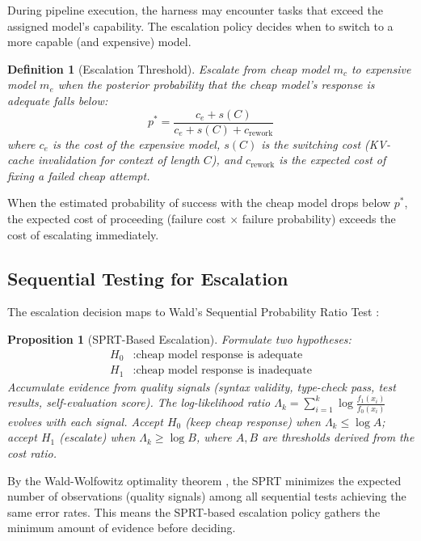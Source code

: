 \documentclass[11pt, a4paper, logo, copyright]{googledeepmind}
\newtheorem{definition}{Definition}[section]
\newtheorem{proposition}{Proposition}[section]
\begin{document}
During pipeline execution, the harness may encounter tasks that exceed the assigned model's capability. The escalation policy decides when to switch to a more capable (and expensive) model.

\begin{definition}[Escalation Threshold]
Escalate from cheap model $m_c$ to expensive model $m_e$ when the posterior probability that the cheap model's response is adequate falls below:
\begin{equation}
\label{eq:escalation}
p^* = \frac{c_e + s(C)}{c_e + s(C) + c_{\mathrm{rework}}}
\end{equation}
where $c_e$ is the cost of the expensive model, $s(C)$ is the switching cost (KV-cache invalidation for context of length $C$), and $c_{\mathrm{rework}}$ is the expected cost of fixing a failed cheap attempt.
\end{definition}

When the estimated probability of success with the cheap model drops below $p^*$, the expected cost of proceeding (failure cost $\times$ failure probability) exceeds the cost of escalating immediately.

\subsection{Sequential Testing for Escalation}

The escalation decision maps to Wald's Sequential Probability Ratio Test \citep{wald1945}:

\begin{proposition}[SPRT-Based Escalation]
\label{prop:sprt}
Formulate two hypotheses:
\begin{align}
H_0&: \text{cheap model response is adequate} \\
H_1&: \text{cheap model response is inadequate}
\end{align}
Accumulate evidence from quality signals (syntax validity, type-check pass, test results, self-evaluation score). The log-likelihood ratio $\Lambda_k = \sum_{i=1}^k \log \frac{f_1(x_i)}{f_0(x_i)}$ evolves with each signal. Accept $H_0$ (keep cheap response) when $\Lambda_k \leq \log A$; accept $H_1$ (escalate) when $\Lambda_k \geq \log B$, where $A, B$ are thresholds derived from the cost ratio.
\end{proposition}

By the Wald-Wolfowitz optimality theorem \citep{waldwolfowitz1948}, the SPRT minimizes the expected number of observations (quality signals) among all sequential tests achieving the same error rates. This means the SPRT-based escalation policy gathers the minimum amount of evidence before deciding.
\end{document}
